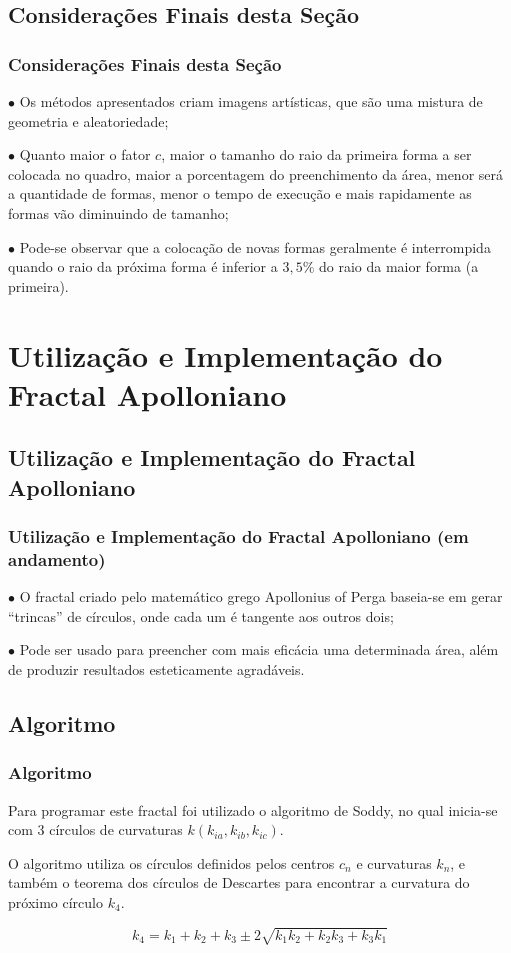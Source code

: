 \documentclass[aspectratio=169,11pt,red]{beamer}
\begin{document}
\subsection{Considerações Finais desta Seção}
\begin{frame}
\frametitle{Considerações Finais desta Seção}
$\bullet$ Os métodos apresentados criam imagens artísticas, que são uma mistura de geometria e aleatoriedade;
\medskip

$\bullet$ Quanto maior o fator $c$, maior o tamanho do raio da primeira forma a ser colocada no quadro, maior a porcentagem do preenchimento da área, menor será a quantidade de formas, menor o tempo de execução e mais rapidamente as formas vão diminuindo de tamanho;
\medskip

$\bullet$ Pode-se observar que a colocação de novas formas geralmente é interrompida quando o raio da próxima forma é inferior a $3,5\%$ do raio da maior forma (a primeira).
\end{frame}

\section{Utilização e Implementação do Fractal Apolloniano}
\subsection{Utilização e Implementação do Fractal Apolloniano}
\begin{frame}
\frametitle{Utilização e Implementação do Fractal Apolloniano (em andamento)}

$\bullet$ O fractal criado pelo matemático grego Apollonius of Perga baseia-se em gerar ``trincas'' de círculos, onde cada um é tangente aos outros dois;
\medskip
\pause

$\bullet$ Pode ser usado para preencher com mais eficácia uma determinada área, além de produzir resultados esteticamente agradáveis.
\medskip

\end{frame}

\subsection{Algoritmo}
\begin{frame}
\frametitle{Algoritmo}
Para programar este fractal foi utilizado o algoritmo de Soddy, no qual inicia-se com 3 círculos de curvaturas $k (k_{ia}, k_{ib}, k_{ic})$.
\medskip

O algoritmo utiliza os círculos definidos pelos centros $c_{n}$ e curvaturas $k_{n}$, e também o teorema dos círculos de Descartes para encontrar a curvatura do próximo círculo $k_{4}$.
\medskip

\begin{equation}
k_{4} = k_{1} + k_{2} + k_{3} \pm 2 \sqrt{k_{1}k_{2} + k_{2}k_{3} + k_{3}k_{1}}
\end{equation}
\end{frame}
\end{document}
